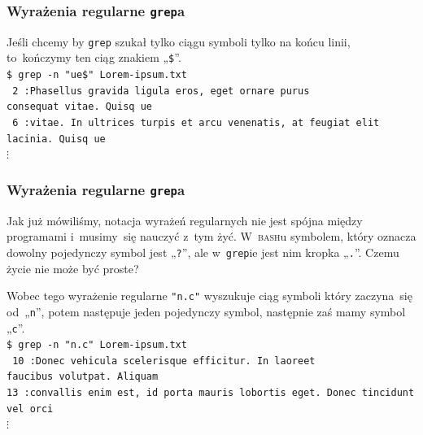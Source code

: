 \documentclass[10pt,t]{beamer}
\begin{document}
\begin{frame}
  \frametitle{Wyrażenia regularne \texttt{grep}a}


  Jeśli chcemy by \texttt{grep} szukał tylko ciągu symboli tylko na końcu
  linii, to~kończymy ten ciąg znakiem „\texttt{\$}”. \\
  \texttt{\$ grep -n "ue\$"{} Lorem-ipsum.txt} \\
  \texttt{{\color{green} 2}{\color{jAxisBlue} :}Phasellus gravida ligula
    eros, eget ornare purus} \\
  \texttt{consequat vitae. Quisq{\color{red} ue}} \\
  \texttt{{\color{green} 6}{\color{jAxisBlue} :}vitae. In ultrices turpis
    et arcu venenatis, at feugiat elit lacinia. Quisq{\color{red} ue}} \\
  \hspace{1em} $\vdots$

\end{frame}





\begin{frame}
  \frametitle{Wyrażenia regularne \texttt{grep}a}


  Jak już mówiliśmy, notacja wyrażeń regularnych nie jest spójna między
  programami i~musimy~się nauczyć z~tym żyć. W~\textsc{bash}u symbolem,
  który oznacza dowolny pojedynczy symbol jest „\texttt{?}”, ale
  w~\texttt{grep}ie jest nim kropka „\texttt{.}”. Czemu życie nie może być
  proste?

  Wobec tego wyrażenie regularne \texttt{"n.c"} wyszukuje ciąg symboli
  który zaczyna~się od~„\texttt{n}”, potem następuje jeden pojedynczy
  symbol, następnie zaś mamy symbol „\texttt{c}”. \\
  \texttt{\$ grep -n "n.c"{} Lorem-ipsum.txt} \\
  \texttt{{\color{green} 10}{\color{jAxisBlue} :}Do{\color{red}nec}
    vehicula scelerisque efficitur. In laoreet} \\
  \texttt{faucibus volutpat. Aliquam} \\
  \texttt{{\color{green}13}{\color{jAxisBlue} :}convallis enim est, id
    porta mauris lobortis eget. Do{\color{red}nec} tincidunt vel orci} \\
  \hspace{1em} $\vdots$

\end{frame}
\end{document}
